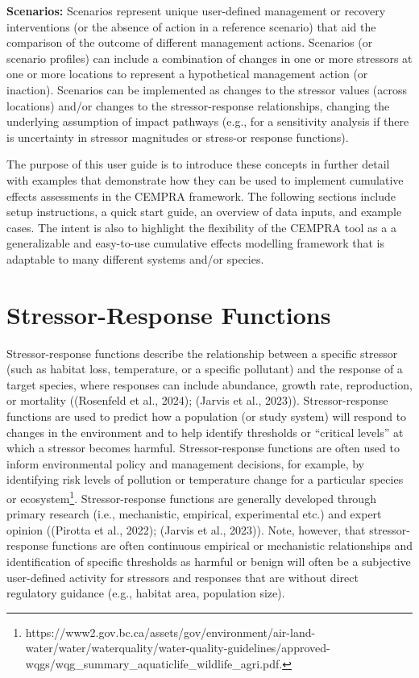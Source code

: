 \documentclass[
  letterpaper,
  DIV=11,
  numbers=noendperiod]{scrreprt}
\begin{document}
\textbf{Scenarios:} Scenarios represent unique user-defined management
or recovery interventions (or the absence of action in a reference
scenario) that aid the comparison of the outcome of different management
actions. Scenarios (or scenario profiles) can include a combination of
changes in one or more stressors at one or more locations to represent a
hypothetical management action (or inaction). Scenarios can be
implemented as changes to the stressor values (across locations) and/or
changes to the stressor-response relationships, changing the underlying
assumption of impact pathways (e.g., for a sensitivity analysis if there
is uncertainty in stressor magnitudes or stress-or response functions).

The purpose of this user guide is to introduce these concepts in further
detail with examples that demonstrate how they can be used to implement
cumulative effects assessments in the CEMPRA framework. The following
sections include setup instructions, a quick start guide, an overview of
data inputs, and example cases. The intent is also to highlight the
flexibility of the CEMPRA tool as a a generalizable and easy-to-use
cumulative effects modelling framework that is adaptable to many
different systems and/or species.


\hypertarget{stressor-response-functions}{%
\chapter{Stressor-Response
Functions}\label{stressor-response-functions}}

Stressor-response functions describe the relationship between a specific
stressor (such as habitat loss, temperature, or a specific pollutant)
and the response of a target species, where responses can include
abundance, growth rate, reproduction, or mortality ((Rosenfeld et al.,
2024); (Jarvis et al., 2023)). Stressor-response functions are used to
predict how a population (or study system) will respond to changes in
the environment and to help identify thresholds or ``critical levels''
at which a stressor becomes harmful. Stressor-response functions are
often used to inform environmental policy and management decisions, for
example, by identifying risk levels of pollution or temperature change
for a particular species or ecosystem\footnote{https://www2.gov.bc.ca/assets/gov/environment/air-land-water/water/waterquality/water-quality-guidelines/approved-wqgs/wqg\_summary\_aquaticlife\_wildlife\_agri.pdf.}.
Stressor-response functions are generally developed through primary
research (i.e., mechanistic, empirical, experimental etc.) and expert
opinion ((Pirotta et al., 2022); (Jarvis et al., 2023)). Note, however,
that stressor-response functions are often continuous empirical or
mechanistic relationships and identification of specific thresholds as
harmful or benign will often be a subjective user-defined activity for
stressors and responses that are without direct regulatory guidance
(e.g., habitat area, population size).
\end{document}
